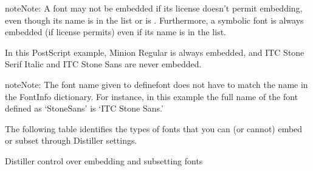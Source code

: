 \documentclass[letterpaper,12pt,english,openany,oneside]{sphinxmanual}
\begin{document}
\begin{sphinxadmonition}{note}{Note:}
A font may not be embedded if its license doesn’t permit embedding, even though its name is in the  list or  is  . Furthermore, a symbolic font is always embedded (if license permits) even if its name is in the  list.
\end{sphinxadmonition}

In this PostScript example, Minion Regular is always embedded, and ITC Stone Serif Italic and ITC Stone Sans are never embedded.

\begin{sphinxVerbatim}[commandchars=\\\{\}]
  \PYG{p}{[}  \PYG{p}{]}

           \PYG{p}{[}   \PYG{p}{]}

   
\end{sphinxVerbatim}

\begin{sphinxadmonition}{note}{Note:}
The font name given to definefont does not have to match the name in the FontInfo dictionary. For instance, in this example the full name of the font defined as ‘StoneSans’ is ‘ITC Stone Sans.’
\end{sphinxadmonition}

The following table identifies the types of fonts that you can (or cannot) embed or subset through Distiller settings.

Distiller control over embedding and subsetting fonts
\end{document}
